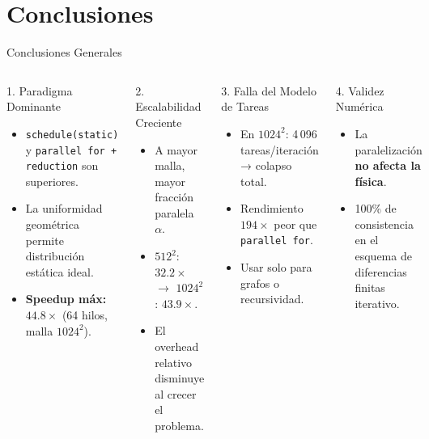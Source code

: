 \documentclass[aspectratio=169,10pt,xcolor=table]{beamer}
\begin{document}
\section{Conclusiones}

\begin{frame}[shrink=10]{Conclusiones Generales}
  \begin{columns}[t]
      \begin{block}{1. Paradigma Dominante}
        \begin{itemize}
            \item \texttt{schedule(static)} y \texttt{parallel for + reduction} son superiores.
            \item La uniformidad geométrica permite distribución estática ideal.
            \item \textbf{Speedup máx:} $44.8\times$ (64 hilos, malla $1024^2$).
        \end{itemize}
      \end{block}

      \begin{block}{2. Escalabilidad Creciente}
        \begin{itemize}
          \item A mayor malla, mayor fracción paralela $\alpha$.
          \item $512^2$: $32.2\times$ \quad $\rightarrow$ \quad $1024^2$: $43.9\times$.
          \item El overhead relativo disminuye al crecer el problema.
        \end{itemize}
      \end{block}
      \begin{alertblock}{3. Falla del Modelo de Tareas}
        \begin{itemize}
            \item En $1024^2$: 4\,096 tareas/iteración → colapso total.
            \item Rendimiento $194\times$ peor que \texttt{parallel for}.
            \item Usar solo para grafos o recursividad.
        \end{itemize}
      \end{alertblock}

      \begin{exampleblock}{4. Validez Numérica}
        \begin{itemize}
            \item La paralelización \textbf{no afecta la física}.
            \item 100\% de consistencia en el esquema de diferencias finitas iterativo.
        \end{itemize}
      \end{exampleblock}
  \end{columns}


\end{frame}
\end{document}
